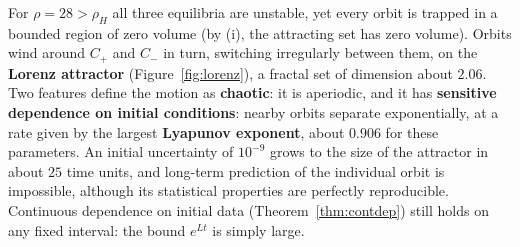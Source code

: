 \documentclass[11pt,a4paper]{article}
\numberwithin{equation}{section}
\theoremstyle{definition}
\begin{document}
For $\rho = 28 > \rho_H$ all three equilibria are unstable, yet every orbit is trapped in a bounded region of zero volume (by (i), the attracting set has zero volume). Orbits wind around $C_+$ and $C_-$ in turn,
switching irregularly between them, on the \textbf{Lorenz attractor} (Figure~\ref{fig:lorenz}), a fractal set of dimension about $2.06$. Two features define the motion as \textbf{chaotic}: it is aperiodic, and it
has \textbf{sensitive dependence on initial conditions}: nearby orbits separate exponentially, at a rate given by the largest \textbf{Lyapunov exponent}, about $0.906$ for these parameters. An initial
uncertainty of $10^{-9}$ grows to the size of the attractor in about $25$ time units, and long-term prediction of the individual orbit is impossible, although its statistical properties are perfectly
reproducible. Continuous dependence on initial data (Theorem~\ref{thm:contdep}) still holds on any fixed interval: the bound $e^{Lt}$ is simply large.
\end{document}
